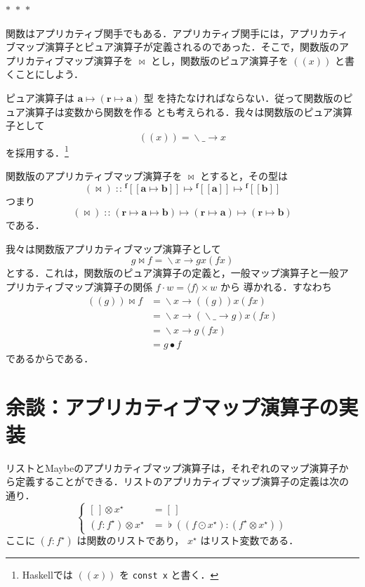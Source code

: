 \documentclass[a5paper,twoside,fleqn,draft]{jsbook}
\def\[{[\![}
\def\]{]\!]}
\newcommand{\separator}{\begin{center}$*$~$*$~$*$\end{center}}
\newcommand{\programminglanguage}[1]{\textsf{#1}}
\newcommand{\haskell}{\programminglanguage{Haskell}}
\newcommand{\code}[1]{\texttt{#1}}
\newcommand{\mEmptyList}{{[\,]}}
\DeclareMathOperator{\mAppMap}{\times}
\DeclareMathOperator{\mAppMapFunc}{\bowtie}
\DeclareMathOperator{\mAppMapList}{\otimes}
\DeclareMathOperator{\mComp}{\bullet}
\DeclareMathOperator{\mIn}{{:\!:}}
\DeclareMathOperator{\mJoinList}{\flat} %
\DeclareMathOperator{\mLambda}{\backslash}
\DeclareMathOperator{\mLambdaArrow}{\rightarrow}
\DeclareMathOperator{\mMap}{\cdot}
\DeclareMathOperator{\mMapList}{\odot}
\DeclareMathOperator{\mMapsTo}{\mapsto}
\newcommand{\mType}[1]{\mathbf{#1}} %
\newcommand{\mA}{\mType{a}}
\newcommand{\mB}{\mType{b}}
\newcommand{\mR}{\mType{r}}
\newcommand{\mTypeAssemble}[2]{{}^{\mType{#1}}\[\mType{#2}\]}
\newcommand{\mFuncWith}[1]{((#1))}  %
\newcommand{\mPureWith}[1]{\langle#1\rangle}
\newcommand{\mList}[1]{{#1}^\mathrm{\star}}
\newcommand{\mLambdaEXP}[2]{\mLambda{#1}\mLambdaArrow{#2}} %
\newcommand{\mProjEXP}[2]{#1\mMapsTo#2} %
\begin{document}
\separator

関数はアプリカティブ関手でもある．アプリカティブ関手には，アプリカティ
ブマップ演算子とピュア演算子が定義されるのであった．そこで，関数版のア
プリカティブマップ演算子を $\mAppMapFunc$ とし，関数版のピュア演算子を
$\mFuncWith{x}$ と書くことにしよう．

ピュア演算子は $\mProjEXP{\mA }{(\mProjEXP{\mR}{\mA })}$ 型
を持たなければならない．従って関数版のピュア演算子は変数から関数を作る
とも考えられる．我々は関数版のピュア演算子として
\begin{equation}
  \mFuncWith{x}
  =\mLambdaEXP{\_}{x}
\end{equation}
を採用する．\footnote{\haskell では $\mFuncWith{x}$ を \code{const x} と書く．}

関数版のアプリカティブマップ演算子を $\mAppMapFunc$ とすると，その型は
\begin{equation}
  (\mAppMapFunc)
  \mIn\mTypeAssemble{f}{\mA\mMapsTo\mB}
  \mMapsTo\mTypeAssemble{f}{\mA}
  \mMapsTo\mTypeAssemble{f}{\mB}
\end{equation}
つまり
\begin{equation}
  (\mAppMapFunc)
  \mIn{}(\mR\mMapsTo\mA\mMapsTo\mB)
  \mMapsTo(\mR\mMapsTo\mA)
  \mMapsTo(\mR\mMapsTo\mB)
\end{equation}
である．

我々は関数版アプリカティブマップ演算子として
\begin{equation}
g\mAppMapFunc f=\mLambdaEXP{x}{gx(fx)}
\end{equation}
とする．これは，関数版のピュア演算子の定義と，一般マップ演算子と一般ア
プリカティブマップ演算子の関係 $f\mMap w=\mPureWith{f}\mAppMap w$ から
導かれる．すなわち
\begin{align}
\mFuncWith{g}\mAppMapFunc f
&=\mLambdaEXP{x}{\mFuncWith{g}x(fx)}\\
&=\mLambdaEXP{x}{(\mLambdaEXP{\_}{g})x(fx)}\\
&=\mLambdaEXP{x}{g(fx)}\\
&=g\mComp f
\end{align}
であるからである．

\section{余談：アプリカティブマップ演算子の実装}

リストとMaybeのアプリカティブマップ演算子は，それぞれのマップ演算子か
ら定義することができる．リストのアプリカティブマップ演算子の定義は次の
通り．
\begin{equation}
  \left\{
  \begin{aligned}
    \mEmptyList\mAppMapList\mList{x}
    &=\mEmptyList\\
    (f:\mList{f})\mAppMapList\mList{x}
    &=\mJoinList{}((f\mMapList\mList{x}):(\mList{f}\mAppMapList\mList{x}))
  \end{aligned}
  \right.
\end{equation}
ここに $(f:\mList{f})$ は関数のリストであり， $\mList{x}$ はリスト変数である．
\end{document}
